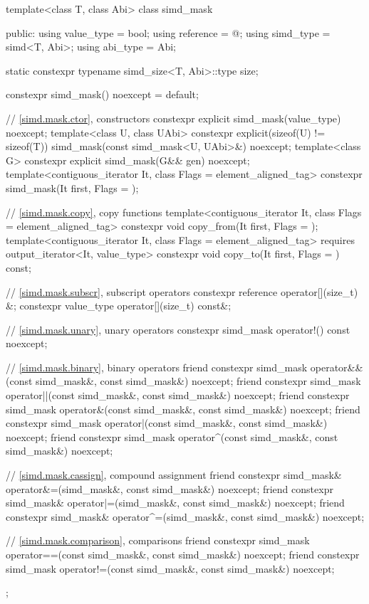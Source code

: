 \begin{codeblock}
template<class T, class Abi> class simd_mask {
public:
  using value_type = bool;
  using reference = @\seebelow@;
  using simd_type = simd<T, Abi>;
  using abi_type = Abi;

  static constexpr typename simd_size<T, Abi>::type size;

  constexpr simd_mask() noexcept = default;

  // \ref{simd.mask.ctor},  constructors
  constexpr explicit simd_mask(value_type) noexcept;
  template<class U, class UAbi>
    constexpr explicit(sizeof(U) != sizeof(T)) simd_mask(const simd_mask<U, UAbi>&) noexcept;
  template<class G> constexpr explicit simd_mask(G&& gen) noexcept;
  template<contiguous_iterator It, class Flags = element_aligned_tag>
    constexpr simd_mask(It first, Flags = {});

  // \ref{simd.mask.copy},  copy functions
  template<contiguous_iterator It, class Flags = element_aligned_tag>
    constexpr void copy_from(It first, Flags = {});
  template<contiguous_iterator It, class Flags = element_aligned_tag>
    requires output_iterator<It, value_type>
    constexpr void copy_to(It first, Flags = {}) const;

  // \ref{simd.mask.subscr},  subscript operators
  constexpr reference operator[](size_t) &;
  constexpr value_type operator[](size_t) const&;

  // \ref{simd.mask.unary},  unary operators
  constexpr simd_mask operator!() const noexcept;

  // \ref{simd.mask.binary},  binary operators
  friend constexpr simd_mask operator&&(const simd_mask&, const simd_mask&) noexcept;
  friend constexpr simd_mask operator||(const simd_mask&, const simd_mask&) noexcept;
  friend constexpr simd_mask operator&(const simd_mask&, const simd_mask&) noexcept;
  friend constexpr simd_mask operator|(const simd_mask&, const simd_mask&) noexcept;
  friend constexpr simd_mask operator^(const simd_mask&, const simd_mask&) noexcept;

  // \ref{simd.mask.cassign},  compound assignment
  friend constexpr simd_mask& operator&=(simd_mask&, const simd_mask&) noexcept;
  friend constexpr simd_mask& operator|=(simd_mask&, const simd_mask&) noexcept;
  friend constexpr simd_mask& operator^=(simd_mask&, const simd_mask&) noexcept;

  // \ref{simd.mask.comparison},  comparisons
  friend constexpr simd_mask operator==(const simd_mask&, const simd_mask&) noexcept;
  friend constexpr simd_mask operator!=(const simd_mask&, const simd_mask&) noexcept;
};
\end{codeblock}

